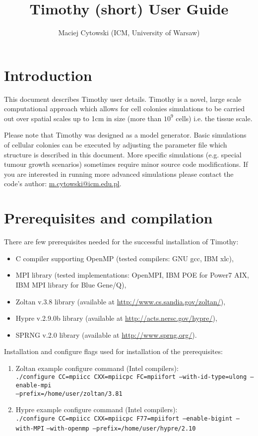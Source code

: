 \documentclass[10pt]{article}
\title{Timothy (short) User Guide}
\author{Maciej Cytowski (ICM, University of Warsaw)}
\begin{document}
\maketitle

\section{Introduction}

This document describes Timothy user details. Timothy is a novel, 
large scale computational approach which allows for cell colonies simulations to be carried out over spatial scales up to 1cm in size (more than $10^9$ cells) i.e. the tissue scale. 

Please note that Timothy was designed as a model generator. Basic simulations of cellular colonies can be executed by adjusting the parameter file which structure is described in this document. More specific simulations (e.g. special tumour growth scenarios) sometimes require minor source code modifications. If you are interested in running more advanced simulations please contact the code's author: \url{m.cytowski@icm.edu.pl}. 

\section{Prerequisites and compilation}

There are few prerequisites needed for the successful installation of Timothy:
\begin{itemize}
\item C compiler supporting OpenMP (tested compilers: GNU gcc, IBM xlc),
\item MPI library (tested implementations: OpenMPI, IBM POE for Power7 AIX, IBM MPI library for Blue Gene/Q),
\item Zoltan v.3.8 library (available at \url{http://www.cs.sandia.gov/zoltan/}),    
\item Hypre v.2.9.0b library (available at \url{http://acts.nersc.gov/hypre/}),
\item SPRNG v.2.0 library (available at \url{http://www.sprng.org/}).
\end{itemize} 
Installation and configure flags used for installation of the prerequisites:
\begin{enumerate}
\item Zoltan example configure command (Intel compilers):\\
{\tt ./configure CC=mpiicc CXX=mpiicpc FC=mpiifort --with-id-type=ulong --enable-mpi}\\ {\tt --prefix=/home/user/zoltan/3.81}
\item Hypre example configure command (Intel compilers):\\
{\tt ./configure CC=mpiicc CXX=mpiicpc F77=mpiifort --enable-bigint --with-MPI} {\tt --with-openmp --prefix=/home/user/hypre/2.10}
\end{enumerate}
\end{document}
